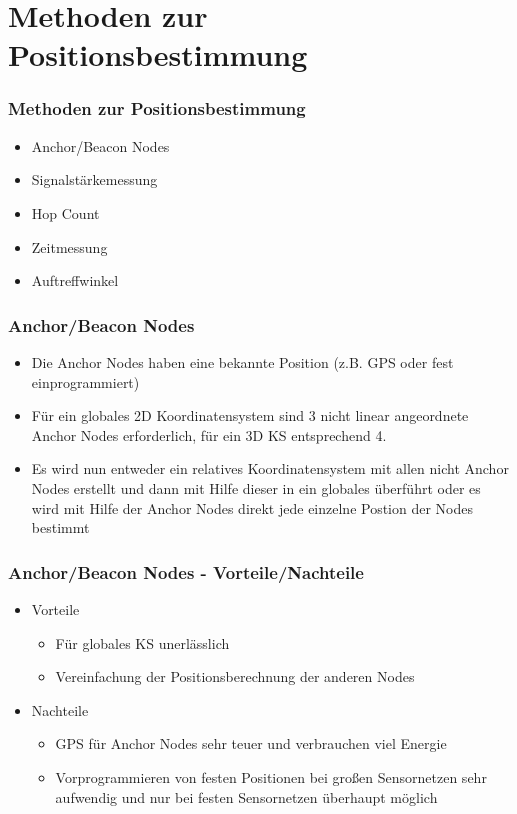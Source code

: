 \section{Methoden zur Positionsbestimmung}
\label{sec:methoden}

\begin{frame}
\frametitle{Methoden zur Positionsbestimmung}

\begin{itemize}
   \item Anchor/Beacon Nodes
   \item Signalstärkemessung
   \item Hop Count
   \item Zeitmessung
   \item Auftreffwinkel
\end{itemize}

\end{frame}

\begin{frame}
\frametitle{Anchor/Beacon Nodes}

\begin{itemize}
  \item Die Anchor Nodes haben eine bekannte Position (z.B. GPS oder fest einprogrammiert)
  \item Für ein globales 2D Koordinatensystem sind 3 nicht linear angeordnete Anchor Nodes erforderlich, für ein 3D KS entsprechend 4.
  \item Es wird nun entweder ein relatives Koordinatensystem mit allen nicht Anchor Nodes erstellt und dann mit Hilfe dieser in ein globales überführt oder es wird mit Hilfe der Anchor Nodes direkt jede einzelne Postion der Nodes bestimmt
\end{itemize}
\end{frame}

\begin{frame}
\frametitle{Anchor/Beacon Nodes - Vorteile/Nachteile}

\begin{itemize}
  \item Vorteile
  \begin{itemize}
    \item Für globales KS unerlässlich
    \item Vereinfachung der Positionsberechnung der anderen Nodes
  \end{itemize}
  \item Nachteile
  \begin{itemize}
    \item GPS für Anchor Nodes sehr teuer und verbrauchen viel Energie
    \item Vorprogrammieren von festen Positionen bei großen Sensornetzen sehr aufwendig und nur bei festen Sensornetzen überhaupt möglich
  \end{itemize}
\end{itemize}
\end{frame}

